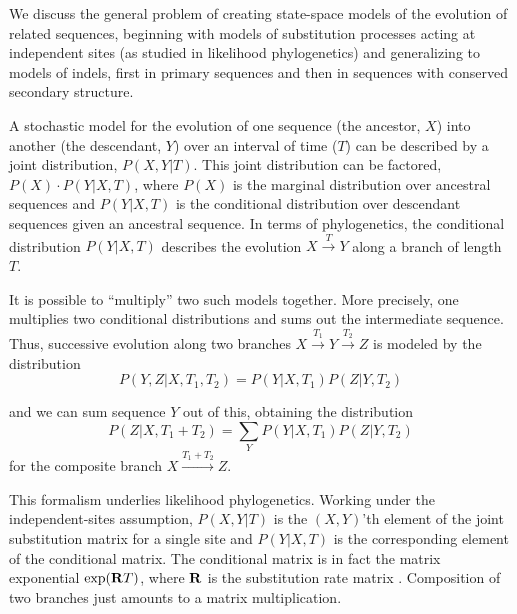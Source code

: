 \documentclass[10pt]{article}
\begin{document}
We discuss the general problem of creating state-space models of the
evolution of related sequences, beginning with models of substitution processes acting at independent
sites (as studied in likelihood phylogenetics) and generalizing to models of
indels, first in primary sequences and then in sequences with
conserved secondary structure.

A stochastic model for the evolution of one sequence (the ancestor, $X$) into
another (the descendant, $Y$) over an interval of time ($T$) can be described by a
joint distribution, $P (X, Y | T)$.
This joint distribution can be factored, $P (X) \cdot P (Y | X, T)$, 
where $P(X)$ is the marginal distribution over ancestral sequences
and $P(Y | X, T)$ is the conditional distribution over descendant sequences given an ancestral sequence.
In terms of phylogenetics, the conditional distribution $P(Y | X, T)$ describes the evolution $X \stackrel{T}{\to} Y$
along a branch of length $T$.

It is possible to ``multiply'' two such models together.
More precisely, one multiplies two conditional distributions and sums out the intermediate sequence.
Thus, successive evolution along two branches $X \stackrel{T_1}{\to} Y \stackrel{T_2}{\to} Z$
is modeled by the distribution
\[
P(Y,Z|X,T_1,T_2) = P(Y | X, T_1) P(Z | Y, T_2)
\]

and we can sum sequence $Y$ out of this, obtaining the distribution
\[
P(Z|X,T_1+T_2) = \sum_Y P(Y | X, T_1) P(Z | Y, T_2)
\]
for the composite branch
$X \stackrel{T_1 + T_2}{\longrightarrow} Z$.

This formalism underlies likelihood phylogenetics.
Working under the independent-sites assumption, $P (X, Y | T)$ is the $(X,Y)$'th element of the joint substitution matrix for a single site
and $P(Y | X, T)$ is the corresponding element of the conditional matrix.
The conditional matrix is in fact the matrix exponential
 $\exp({\bf R}T)$, where ${\bf R}$ is the substitution rate matrix \cite{HolmesRubin2002b}.
Composition of two branches just amounts to a matrix multiplication.
\end{document}
